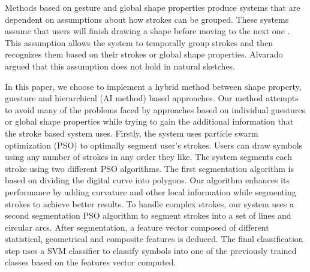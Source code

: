 \documentclass[preprint,10pt,5p,twocolumn]{elsarticle}
\begin{document}
Methods based on gesture and global shape properties produce systems that are dependent on assumptions about how strokes can be grouped. These systems assume that users will finish drawing a shape before moving to the next one \cite{Cali63,geometrydomain49}. This assumption allows the system to temporally group strokes and then recognizes them based on their strokes or global shape properties. Alvarado \cite{AlvaradoDigital} argued that this assumption does not hold in natural sketches. 


In this paper, we choose to implement a hybrid method between shape property, guesture and hierarchical (AI method) based approaches. Our method attempts to avoid many of the problems faced by approaches based on individual guestures or global shape properties while trying to gain the additional information that the stroke based system uses. Firstly, the system uses particle swarm optimization (PSO) to optimally segment user's strokes. Users can draw symbols using any number of strokes in any order they like. The system segments each stroke using two different PSO algorithms. The first segmentation algorithm is based on dividing the digital curve into polygons\cite{PolygonApproximationPSO}. Our algorithm enhances its performance by adding curvature and other local information while segmenting strokes to achieve better results. To handle complex strokes, our system uses a second segmentation PSO algorithm to segment strokes into a set of lines and circular arcs. After segmentation, a feature vector composed of different statistical, geometrical and composite features is deduced. The final classification step uses a SVM classifier to classify symbols into one of the previously trained classes based on the features vector computed.


\end{document}
